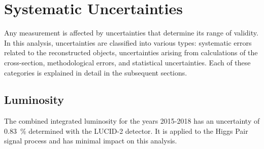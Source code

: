 \chapter{Systematic Uncertainties}\label{ch:systematics}
Any measurement is affected by uncertainties that determine its range of validity. In this analysis, uncertainties are classified into various types: systematic errors related to the reconstructed objects, uncertainties arising from calculations of the cross-section, methodological errors, and statistical uncertainties. Each of these categories is explained in detail in the subsequent sections. 

\section{Luminosity}
The combined integrated luminosity for the years 2015-2018 has an uncertainty of \qty[]{0.83}{\percent} determined with the LUCID-2 detector. It is applied to the Higgs Pair signal process and has minimal impact on this analysis.

